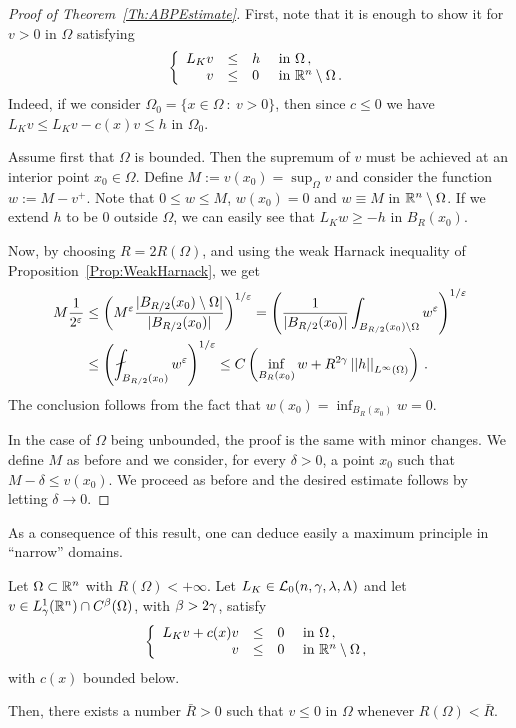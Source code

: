 \begin{proof}[Proof of Theorem~\ref{Th:ABPEstimate}]
	First, note that it is enough to show it for $v > 0$ in $\Omega$ satisfying
	$$
	\left\{\begin{array}{rcll}
	L_K v &\leq & h & \text{ in } \Omega\,, \\
	v & \leq & 0 & \text{ in } \mathbb{R}^n\setminus \Omega\,.
	\end{array} \right.
	$$
	Indeed, if we consider $\Omega_0 = \{x \in \Omega \ : \ v > 0\}$, then since $c \leq 0$ we have $L_K v \leq L_K v - c(x)v \leq h$ in $\Omega_0$.
	
	Assume first that $\Omega$ is bounded. Then the supremum of $v$ must be achieved at an interior point $x_0\in \Omega$. Define	$M:= v(x_0) = \sup_\Omega v$ and consider the function $w := M - v^+$. Note that $0 \leq w \leq M$, $w(x_0) = 0$ and $w \equiv M$ in $\mathbb{R}^n \setminus \Omega$. If we extend $h$ to be $0$ outside $\Omega$, we can easily see that $L_K w \geq -h$ in $B_R(x_0)$.
	
	Now, by choosing $R= 2R(\Omega)$, and using the weak Harnack inequality of Proposition~\ref{Prop:WeakHarnack}, we get
	\begin{align*}
	M \dfrac{1}{2^\varepsilon} & \leq \bpar{M^{\varepsilon}\dfrac{|B_{R/2}(x_0)\setminus \Omega|}{|B_{R/2}(x_0)|}}^{1/\varepsilon}= \bpar{\dfrac{1}{|B_{R/2}(x_0)|} \int_{B_{R/2}(x_0)\setminus \Omega} w^\varepsilon}^{1/\varepsilon} \\
	& \leq \bpar{ \fint_{B_{R/2}(x_0)} w^\varepsilon}^{1/\varepsilon} \leq C \bpar{\inf_{B_{R}(x_0)} w + R^{2\s} \norm{h}_{L^{\infty}(\Omega)} }\,.
	\end{align*}
	The conclusion follows from the fact that $w(x_0)= \inf_{B_{R}(x_0)} w = 0$.
	
	In the case of $\Omega$ being unbounded, the proof is the same with minor changes. We define $M$ as before and we consider, for every $\delta > 0$, a point $x_0$ such that $M-\delta \leq v(x_0)$. We proceed as before and the desired estimate follows by letting $\delta \to 0$.
\end{proof}

As a consequence of this result, one can deduce easily a maximum principle in ``narrow'' domains.

\begin{corollary}
	\label{Cor:MaxPpleNarrowDomains}
	Let $\Omega \subset \mathbb{R}^n$ with $R(\Omega) < +\infty$. Let $L_K \in \mathcal{L}_0(n,\gamma,\lambda, \Lambda)$ and let $v\in L^1_\gamma(\mathbb{R}^n)\cap C^{\beta}(\Omega)$, with $\beta > 2\gamma$, satisfy
	$$
	\left\{\begin{array}{rcll}
	L_K v + c(x)v &\leq & 0 & \text{ in } \Omega\,, \\
	v & \leq & 0 & \text{ in } \mathbb{R}^n\setminus \Omega\,,
	\end{array} \right.
	$$
	with $c(x)$ bounded below.
	
	Then, there exists a number $\bar{R} > 0$ such that $v \leq 0$ in $\Omega$ whenever $R(\Omega)< \bar{R}$.	
\end{corollary}

